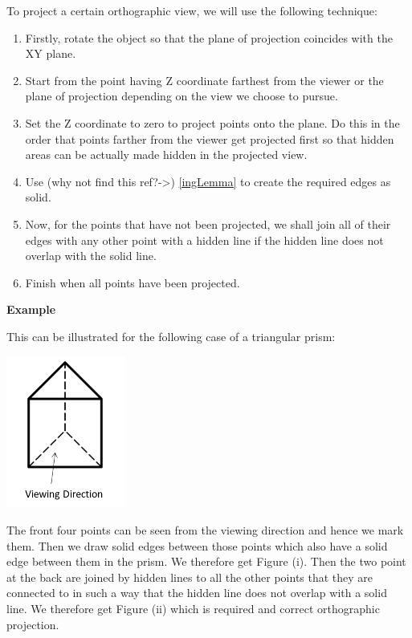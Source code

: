 \documentclass[12pt]{report}
\begin{document}
\vspace{0.2cm}
To project a certain orthographic view, we will use the following technique:
\\
\begin{enumerate}
  \item 
  Firstly, rotate the object so that the plane of projection coincides with the XY plane. 
  \item 
  Start from the point having Z coordinate farthest from the viewer or the plane of projection depending on the view we choose to pursue. 
  \item 
  Set the Z coordinate to zero to project points onto the plane. Do this in the order that points farther from the viewer get projected first so that hidden areas can be actually made hidden in the projected view. 
  \item 
  Use (why not find this ref?->) \ref{ingLemma} to create the required edges as solid. 
  \item 
  Now, for the points that have not been projected, we shall join all of their edges with any other point with a hidden line if the hidden line does not overlap with the solid line.
  \item 
  Finish when all points have been projected. 
  
\end{enumerate}


\large{\textbf{Example}}

This can be illustrated for the following case of a triangular prism:\\


\begin{center}
  \includegraphics[height=5cm]{prism.PNG}
\end{center}

The front four points can be seen from the viewing direction and hence we mark them. Then we draw solid edges between those points which also have a solid edge between them in the prism. We therefore get	Figure (i). Then the two point at the back are joined by hidden lines to all the other points that they are connected to in such a way that the hidden line does not overlap with a solid line. We therefore get Figure (ii) which is required and correct orthographic projection.
\\
\end{document}
